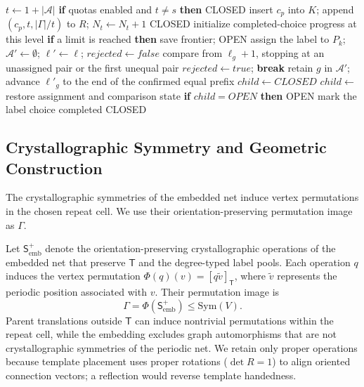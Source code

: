 \documentclass[a5paper, 10pt]{article}
\begin{document}
\begin{algorithm}[H]
\begin{algorithmic}[1]
    \State $t\gets1+|\mathcal A|$
    \State \textbf{if} quotas enabled and $t\ne s$ \textbf{then} \Return CLOSED
      \State insert $c_p$ into $K$; append $(c_p,t,|\Gamma|/t)$ to $R$; $N_t\gets N_t+1$
    \EndIf
    \State \Return CLOSED
  \EndIf
  \State initialize completed-choice progress at this level
    \State \textbf{if} a limit is reached \textbf{then} save frontier; \Return OPEN
    \State assign the label to $P_k$; $\mathcal A'\gets\emptyset$; $\boldsymbol\ell'\gets\boldsymbol\ell$; $rejected\gets false$
      \State compare from $\ell_g+1$, stopping at an unassigned pair or the first unequal pair
        \State $rejected\gets true$; \textbf{break}
        \State retain $g$ in $\mathcal A'$; advance $\ell'_g$ to the end of the confirmed equal prefix
      \EndIf
    \EndFor
    \State $child\gets CLOSED$
      \State $child\gets$ 
    \EndIf
    \State restore assignment and comparison state
    \State \textbf{if} $child=OPEN$ \textbf{then} \Return OPEN
    \State mark the label choice completed
  \EndFor
  \State \Return CLOSED
\EndFunction
\end{algorithmic}
\end{algorithm}

\subsection{Crystallographic Symmetry and Geometric Construction}



\label{sec:reconstruction_method}
The crystallographic symmetries of the embedded net induce vertex permutations in the chosen repeat cell. We use their orientation-preserving permutation image as $\Gamma$.

Let $\mathsf{S}_{\mathrm{emb}}^{+}$ denote the orientation-preserving crystallographic operations of the embedded net that preserve $\mathsf{T}$ and the degree-typed label pools. Each operation $q$ induces the vertex permutation $\Phi(q)(v)=[q\widetilde v]_{\mathsf T}$, where $\widetilde v$ represents the periodic position associated with $v$. Their permutation image is
\begin{equation}
\Gamma=\Phi(\mathsf{S}_{\mathrm{emb}}^{+})\leq\mathrm{Sym}(V).
\label{eq:rotation_group}
\end{equation}
Parent translations outside $\mathsf{T}$ can induce nontrivial permutations within the repeat cell, while the embedding excludes graph automorphisms that are not crystallographic symmetries of the periodic net.
We retain only proper operations because template placement uses proper rotations ($\det R=1$) to align oriented connection vectors; a reflection would reverse template handedness.
\end{document}

